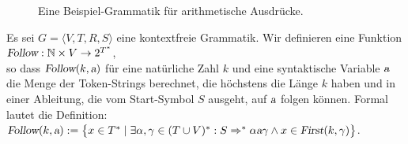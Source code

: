 \begin{figure}[htbp]
  \begin{center}    
  \end{center}
  \caption{Eine Beispiel-Grammatik f\"ur arithmetische Ausdr\"ucke.}
  \label{fig:expr-id.g}
\end{figure}


\begin{Definition}
  Es sei $G = \langle V, T, R, S \rangle$ eine kontextfreie Grammatik. Wir definieren eine Funktion
  \\[0.2cm]
  \hspace*{1.3cm}
  $\textsl{Follow}: \mathbb{N} \times V \rightarrow 2^{T^*}$,
  \\[0.2cm]
  so dass $\textsl{Follow}(k,\textsl{a})$ f\"ur eine nat\"urliche Zahl $k$ und eine syntaktische
  Variable $\textsl{a}$ die Menge der Token-Strings berechnet, die
  h\"ochstens die L\"ange $k$ haben und in einer Ableitung, die vom Start-Symbol $S$ ausgeht,
  auf $\textsl{a}$ folgen k\"onnen.  Formal
  lautet die Definition:
  \\[0.2cm]
  \hspace*{1.3cm}
  $\textsl{Follow}(k, \textsl{a}) := 
  \bigl\{ x \in T^* \mid \exists \alpha, \gamma \in (T\cup V)^*: 
      S \Rightarrow^* \alpha \textsl{a} \gamma \wedge x \in \textsl{First}(k, \gamma) \bigr\}$. \eox
\end{Definition}

